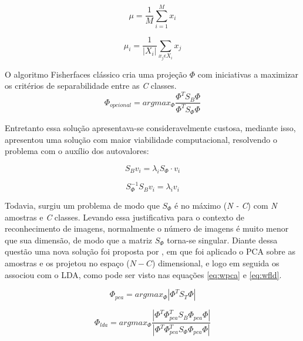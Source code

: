 \begin{equation}
\mu = \frac{1}{M}\sum_{i=1}^{M}x_i
\label{eq:mediageral}
\end{equation}

\begin{equation}
\mu_i = \frac{1}{\left | X_i \right |} \sum_{x_j \epsilon X_i }^{ }x_j
\label{eq:mediaDaClasse}
\end{equation}

O algoritmo Fisherfaces clássico cria uma projeção $\Phi$ com iniciativas a maximizar os critérios de separabilidade entre as \textit{C} classes.
\begin{equation}
\Phi_{opcional} = argmax_\Phi \frac{\Phi^T S_B \Phi}{\Phi^TS_\Phi \Phi}
\end{equation}

Entretanto essa solução apresentava-se consideravelmente custosa, mediante isso,  apresentou uma solução com maior viabilidade computacional, resolvendo o problema com o auxílio dos autovalores:

\begin{equation}
S_Bv_i  =  \lambda_i S_\Phi \cdot v_i  
\end{equation}

\begin{equation}
S_\Phi^{-1}S_B v_i = \lambda_iv_i 
\end{equation}

Todavia, surgiu um problema de modo que \textit{$S_\Phi$} é no máximo (\textit{N - C}) com \textit{N} amostras e \textit{C} classes. Levando essa justificativa para o contexto de reconhecimento de imagens, normalmente  o número de imagens é muito menor que sua dimensão, de modo que a matriz $S_\Phi$ torna-se singular. Diante dessa questão uma nova solução foi proposta por , em que foi aplicado o  PCA sobre as amostras e os projetou no espaço ($N - C$) dimensional, e logo em seguida os associou com o LDA, como pode ser visto nas equações \ref{eq:wpca} e \ref{eq:wfld}.

\begin{equation}
\Phi_{pca} = argmax_\Phi\left |\Phi^TS_T\Phi  \right|
\label{eq:wpca}
\end{equation}

\begin{equation}
\Phi_{lda} = argmax_\Phi \frac{\left |\Phi^T\Phi_{pca}^TS_B\Phi_{pca}\Phi \right |}{ \left| \Phi^T\Phi_{pca}^TS_\Phi\Phi_{pca}\Phi \right |}   
\label{eq:wfld}
\end{equation}

